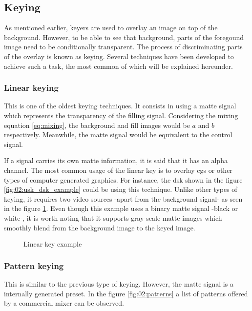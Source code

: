 \documentclass[../main.tex]{subfiles}
\begin{document}
\subsection{Keying}
As mentioned earlier, keyers are used to overlay an image on top of the background. However, to be able to see that background, parts of the foregound image need to be conditionally transparent. The process of discriminating parts of the overlay is known as keying. Several techniques have been developed to achieve such a task, the most common of which will be explained hereunder.\newline

\subsubsection{Linear keying}
This is one of the oldest keying techniques. It consists in using a matte signal which represents the transparency of the filling signal. Considering the mixing equation \eqref{eq:mixing}, the background and fill images would be $a$ and $b$ respectively. Meanwhile, the matte signal would be equivalent to the control signal.\newline

If a signal carries its own matte information, it is said that it has an alpha channel. The most common usage of the linear key is to overlay \glspl{cg} or other types of computer generated graphics. For instance, the \gls{dsk} shown in the figure \ref{fig:02:usk_dsk_example} could be using this technique. Unlike other types of keying, it requires two video sources -apart from the background signal- as seen in the figure \ref{fig:02:linear_key_example}. Even though this example uses a binary matte signal -black or white-, it is worth noting that it supports gray-scale matte images which smoothly blend from the background image to the keyed image.\newline

\begin{figure}[htbp]
    \centering

    \caption{Linear key example}
    \label{fig:02:linear_key_example}
\end{figure}

\subsubsection{Pattern keying}
This is similar to the previous type of keying. However, the matte signal is a internally generated preset. In the figure \ref{fig:02:patterns} a list of patterns offered by a commercial mixer can be observed.\newline
\end{document}
